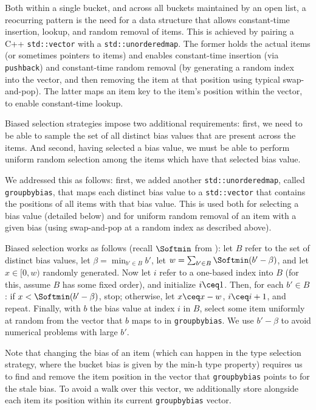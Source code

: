 Both within a single bucket, and across all buckets maintained by an open list, a reocurring pattern is the need for a data structure that allows constant-time insertion, lookup, and random removal of items. This is achieved by pairing a C++ \texttt{std::vector} with a \texttt{std::unordered\textunderscore map}. The former holds the actual items (or sometimes pointers to items) and enables constant-time insertion (via \texttt{push\textunderscore back}) and constant-time random removal (by generating a random index into the vector, and then removing the item at that position using typical swap-and-pop). The latter maps an item key to the item's position within the vector, to enable constant-time lookup.

Biased selection strategies impose two additional requirements: first, we need to be able to sample the set of all distinct bias values that are present across the items. And second, having selected a bias value, we must be able to perform uniform random selection among the items which have that selected bias value.

We addressed this as follows: first, we added another \texttt{std::unordered\textunderscore map}, called \texttt{group\textunderscore by\textunderscore bias}, that maps each distinct bias value to a \texttt{std::vector} that contains the positions of all items with that bias value. This is used both for selecting a bias value (detailed below) and for uniform random removal of an item with a given bias (using swap-and-pop at a random index as described above).

Biased selection works as follows (recall $\Softmin$ from ): let $B$ refer to the set of distinct bias values, let $\beta=\min_{b'\in B}b'$, let $w=\sum_{b'\in B}\Softmin(b'-\beta)$, and let $x\in[0,w)$ randomly generated. Now let $i$ refer to a one-based index into $B$ (for this, assume $B$ has some fixed order), and initialize $i\ceq 1$. Then, for each $b'\in B$: if $x<\Softmin(b'-\beta)$, stop; otherwise, let $x\ceq x-w$, $i\ceq i+1$, and repeat. Finally, with $b$ the bias value at index $i$ in $B$, select some item uniformly at random from the vector that $b$ maps to in \texttt{group\textunderscore by\textunderscore bias}. We use $b'-\beta$ to avoid numerical problems with large $b'$.

Note that changing the bias of an item (which can happen in the \Htss type selection strategy, where the bucket bias is given by the min-h type property) requires us to find and remove the item position in the vector that \texttt{group\textunderscore by\textunderscore bias} points to for the stale bias. To avoid a walk over this vector, we additionally store alongside each item its position within its current \texttt{group\textunderscore by\textunderscore bias} vector.

